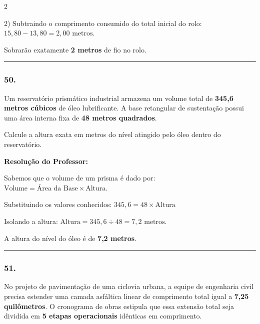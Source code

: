 \begin{multicols*}{2}
\begin{tcolorbox}[colback=CorTitUm!5, colframe=CorTitUm, boxrule=1pt, arc=4pt, left=6pt, right=6pt, top=6pt, bottom=6pt]
    2) Subtraindo o comprimento consumido do total inicial do rolo:
    $15,80 - 13,80 = 2,00\text{ metros}$.
    
    Sobrarão exatamente \textbf{2 metros} de fio no rolo.
    \end{tcolorbox}
\fi

\par\vspace{\espacoQuestao}

\noindent\textcolor{CorLinha}{\rule{\linewidth}{0.5pt}} 
\par\vspace{\espacoPreQuestao}
\subsubsection*{50.} Um reservatório prismático industrial armazena um volume total de \textbf{345,6 metros cúbicos} de óleo lubrificante. A base retangular de sustentação possui uma área interna fixa de \textbf{48 metros quadrados}.

Calcule a altura exata em metros do nível atingido pelo óleo dentro do reservatório.

\ifgabarito
    \begin{tcolorbox}[colback=CorTitUm!5, colframe=CorTitUm, boxrule=1pt, arc=4pt, left=6pt, right=6pt, top=6pt, bottom=6pt]
    \small\textbf{\textcolor{CorTitUm}{Resolução do Professor:}}\par\vspace{0.1cm}
    \color{CinzaEscuro}
    Sabemos que o volume de um prisma é dado por: $\text{Volume} = \text{Área da Base} \times \text{Altura}$.
    
    Substituindo os valores conhecidos:
    $345,6 = 48 \times \text{Altura}$
    
    Isolando a altura:
    $\text{Altura} = 345,6 \div 48 = 7,2\text{ metros}$.
    
    A altura do nível do óleo é de \textbf{7,2 metros}.
    \end{tcolorbox}
\fi

\par\vspace{\espacoQuestao}
\noindent\textcolor{CorLinha}{\rule{\linewidth}{0.5pt}} 
\par\vspace{\espacoPreQuestao}
\subsubsection*{51.} No projeto de pavimentação de uma ciclovia urbana, a equipe de engenharia civil precisa estender uma camada asfáltica linear de comprimento total igual a \textbf{7,25 quilômetros}. O cronograma de obras estipula que essa extensão total seja dividida em \textbf{5 etapas operacionais} idênticas em comprimento.


\end{multicols*}
